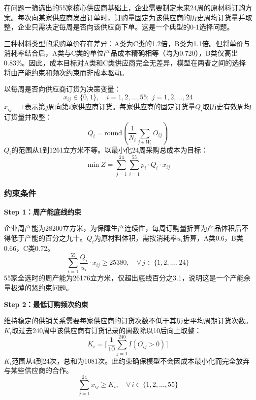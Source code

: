 \documentclass[12pt,a4paper]{ctexart}
\theoremstyle{definition}
\theoremstyle{plain}
\theoremstyle{remark}
\begin{document}
在问题一筛选出的55家核心供应商基础上，企业需要制定未来24周的原材料订购方案。每次向某家供应商发出订单时，订购量固定为该供应商的历史周均订货量并取整，企业只需决定每周是否向该供应商下单。这是一个典型的0-1选择问题。

三种材料类型的采购单价存在差异：A类为C类的1.2倍，B类为1.1倍。但将单价与消耗率结合后，A类与C类的单位产品成本精确相等（均为0.720），B类仅高出0.83\%。因此，成本目标对A类和C类供应商完全无差异，模型在两者之间的选择将由产能约束和频次约束而非成本驱动。

以每周是否向供应商订货为决策变量：
\begin{equation}
x_{ij} \in \{0, 1\}, \quad i = 1, 2, \dots, 55;\; j = 1, 2, \dots, 24
\label{eq:decision2}
\end{equation}
$x_{ij}=1$表示第$j$周向第$i$家供应商订货。每家供应商的固定订货量$Q_i$取历史有效周均订货量并取整：
\begin{equation}
Q_i = \text{round}\!\left(\frac{1}{N_i}\sum_{j \in W_i} O_{ij}\right)
\label{eq:qi2}
\end{equation}
$Q_i$的范围从1到1261立方米不等。以最小化24周采购总成本为目标：
\begin{equation}
\min Z = \sum_{j=1}^{24} \sum_{i=1}^{55} p_i \cdot Q_i \cdot x_{ij}
\label{eq:objective2}
\end{equation}

\subsubsection{约束条件}

\textbf{Step 1：周产能底线约束}

企业周产能为28200立方米，为保障生产连续性，每周订购量折算为产品体积后不得低于产能的百分之九十。$Q_i$为原材料体积，需按消耗率$u_i$折算，A类0.6，B类0.66，C类0.72。
\begin{equation}
\sum_{i=1}^{55} \frac{Q_i}{u_i} \cdot x_{ij} \geq 25380, \quad \forall\, j \in \{1, 2, \dots, 24\}
\label{eq:capacity2}
\end{equation}
55家全选时的周产能为26176立方米，仅超出底线百分之3.1，说明这是一个产能余量极薄的紧约束问题。

\textbf{Step 2：最低订购频次约束}

维持稳定的供销关系需要每家供应商的订货次数不低于其历史平均周期订货次数。$K_i$取过去240周中该供应商有订货记录的周数除以10后向上取整：
\begin{equation}
K_i = \lceil \frac{1}{10} \sum_{j=1}^{240} I(O_{ij} > 0) \rceil
\label{eq:fi2}
\end{equation}
$K_i$范围从4到24次，总和为1081次。此约束确保模型不会因成本最小化而完全放弃与某些供应商的合作。
\begin{equation}
\sum_{j=1}^{24} x_{ij} \geq K_i, \quad \forall\, i \in \{1, 2, \dots, 55\}
\label{eq:frequency2}
\end{equation}
\end{document}
